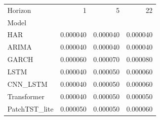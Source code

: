 \begin{tabular}{lrrr}
\toprule
Horizon & 1 & 5 & 22 \\
Model &  &  &  \\
\midrule
HAR & 0.000040 & 0.000040 & 0.000040 \\
ARIMA & 0.000040 & 0.000040 & 0.000040 \\
GARCH & 0.000060 & 0.000070 & 0.000080 \\
LSTM & 0.000040 & 0.000050 & 0.000060 \\
CNN_LSTM & 0.000040 & 0.000050 & 0.000060 \\
Transformer & 0.000040 & 0.000050 & 0.000050 \\
PatchTST_lite & 0.000050 & 0.000050 & 0.000060 \\
\bottomrule
\end{tabular}
